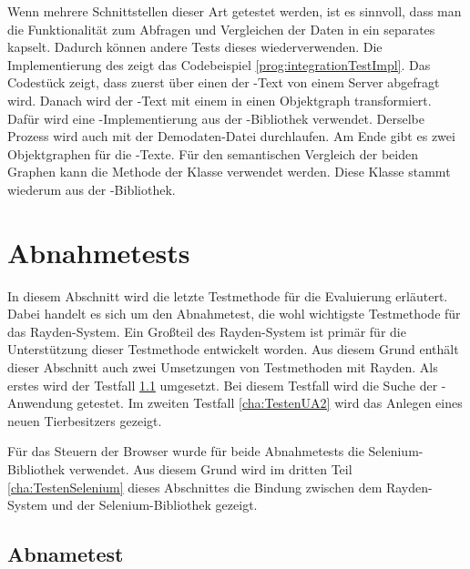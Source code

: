 \SuperPar
Wenn mehrere Schnittstellen dieser Art getestet werden, ist es sinnvoll, dass man die Funktionalität zum Abfragen und Vergleichen der Daten in ein separates  kapselt. Dadurch können andere Tests dieses  wiederverwenden. Die Implementierung des  zeigt das Codebeispiel \ref{prog:integrationTestImpl}. Das Codestück zeigt, dass zuerst über einen  der -Text von einem Server abgefragt wird. Danach wird der -Text mit einem  in einen Objektgraph transformiert. Dafür wird eine -Implementierung aus der -Bibliothek \cite{Guava} verwendet. Derselbe Prozess wird auch mit der Demodaten-Datei durchlaufen. Am Ende gibt es zwei Objektgraphen für die -Texte. Für den semantischen Vergleich der beiden Graphen kann die Methode  der Klasse  verwendet werden. Diese Klasse stammt wiederum aus der -Bibliothek.

\section{Abnahmetests}
\label{cha:TestenUA}

In diesem Abschnitt wird die letzte Testmethode für die Evaluierung erläutert. Dabei handelt es sich um den Abnahmetest, die wohl wichtigste Testmethode für das Rayden-System. Ein Großteil des Rayden-System ist primär für die Unterstützung dieser Testmethode entwickelt worden. Aus diesem Grund enthält dieser Abschnitt auch zwei Umsetzungen von Testmethoden mit Rayden. Als erstes wird der Testfall  \ref{cha:TestenUA1} umgesetzt. Bei diesem Testfall wird die Suche der -Anwendung getestet. Im zweiten Testfall \ref{cha:TestenUA2} wird das Anlegen eines neuen Tierbesitzers gezeigt. 

\SuperPar
Für das Steuern der Browser wurde für beide Abnahmetests die Selenium-Bibliothek verwendet. Aus diesem Grund wird im dritten Teil \ref{cha:TestenSelenium} dieses Abschnittes die Bindung zwischen dem Rayden-System und der Selenium-Bibliothek gezeigt. 


\subsection{Abnametest }
\label{cha:TestenUA1}


